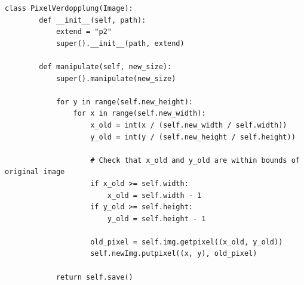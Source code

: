     \begin{lstlisting}[caption={Python-Klasse zur Pixelverdopplung und Bildmanipulation: Implementierung des Algorithmus mit der Pillow-Bibliothek und Erklärung des Codes von PixelVerdopplung: \url{https://github.com/studienarbeit-cnn-dhbwka-2022/Code/blob/main/backend/skalierungsmethoden/pixel_verdopplung.py}.}]
    class PixelVerdopplung(Image):
        def __init__(self, path):
            extend = "p2"
            super().__init__(path, extend)
        
        def manipulate(self, new_size):
            super().manipulate(new_size)
        
            for y in range(self.new_height):
                for x in range(self.new_width):
                    x_old = int(x / (self.new_width / self.width))
                    y_old = int(y / (self.new_height / self.height))
        
                    # Check that x_old and y_old are within bounds of original image
                    if x_old >= self.width:
                        x_old = self.width - 1
                    if y_old >= self.height:
                        y_old = self.height - 1
        
                    old_pixel = self.img.getpixel((x_old, y_old))
                    self.newImg.putpixel((x, y), old_pixel)
        
            return self.save()
    \end{lstlisting}
        
